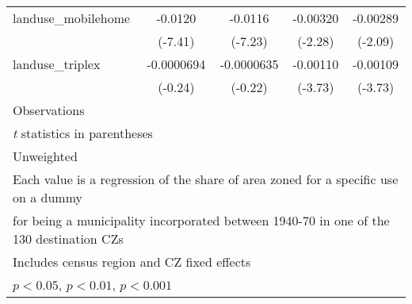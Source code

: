 \begin{table}[htbp]
\begin{tabular}{l*{4}{c}}
\addlinespace
landuse\_mobilehome  &     -0.0120\sym{***}&     -0.0116\sym{***}&    -0.00320\sym{*}  &    -0.00289\sym{*}  \\
                    &     (-7.41)         &     (-7.23)         &     (-2.28)         &     (-2.09)         \\
\addlinespace
landuse\_triplex     &  -0.0000694         &  -0.0000635         &    -0.00110\sym{***}&    -0.00109\sym{***}\\
                    &     (-0.24)         &     (-0.22)         &     (-3.73)         &     (-3.73)         \\
\midrule
Observations        &                     &                     &                     &                     \\
\bottomrule
\multicolumn{5}{l}{\footnotesize \textit{t} statistics in parentheses}\\
\multicolumn{5}{l}{\footnotesize Unweighted}\\
\multicolumn{5}{l}{\footnotesize Each value is a regression of the share of area zoned for a specific use on a dummy}\\
\multicolumn{5}{l}{\footnotesize for being a municipality incorporated between 1940-70 in one of the 130 destination CZs}\\
\multicolumn{5}{l}{\footnotesize Includes census region and CZ fixed effects}\\
\multicolumn{5}{l}{\footnotesize \sym{*} \(p<0.05\), \sym{**} \(p<0.01\), \sym{***} \(p<0.001\)}\\
\end{tabular}
\end{table}
